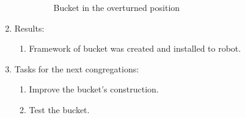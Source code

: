 \begin{enumerate}
\begin{enumerate}
\begin{figure}[H]
\begin{minipage}[h]{0.47\linewidth}
				\caption{Bucket in the overturned position}
			\end{minipage}
		\end{figure}
		
	\end{enumerate}
	
	\item Results:
	\begin{enumerate}
		\item Framework of bucket was created and installed to robot.
		
	\end{enumerate}
	
	\item Tasks for the next congregations:
	\begin{enumerate}
		\item Improve the bucket's construction.
		
		\item Test the bucket.
		
	\end{enumerate}     
\end{enumerate}
\fillpage

